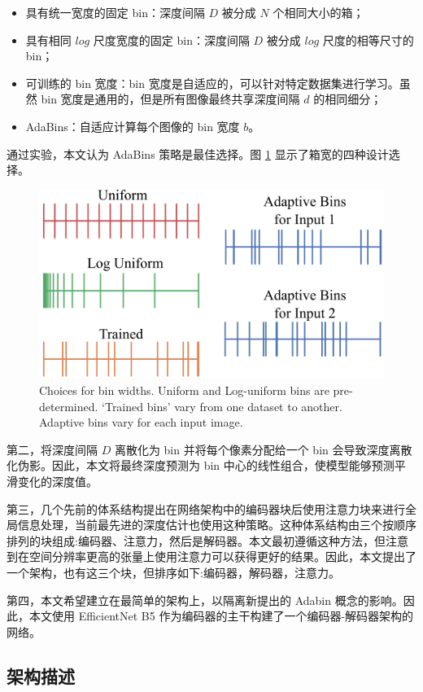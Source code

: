 \documentclass{vip-theme}
\begin{document}
 \begin{itemize}
 	\item 具有统一宽度的固定 bin：深度间隔 $D$ 被分成 $N$ 个相同大小的箱；
	\item 具有相同 $log$ 尺度宽度的固定 bin：深度间隔 $D$ 被分成 $log$ 尺度的相等尺寸的 bin；
	\item 可训练的 bin 宽度：bin 宽度是自适应的，可以针对特定数据集进行学习。虽然 bin 宽度是通用的，但是所有图像最终共享深度间隔 $d$ 的相同细分；
	\item AdaBins：自适应计算每个图像的 bin 宽度 $b$。
 \end{itemize}
 
通过实验，本文认为 AdaBins 策略是最佳选择。图 \ref{fig:binchoices} 显示了箱宽的四种设计选择。

\begin{figure}[!htbp]
\centering
   \includegraphics[width=0.7\linewidth]{./figure/bin-types-v2}
   \caption{Choices for bin widths. Uniform and Log-uniform bins are pre-determined. `Trained bins' vary from one dataset to another. Adaptive bins vary for each input image.}
\label{fig:binchoices}
\end{figure}

     第二，将深度间隔 $D$ 离散化为 bin 并将每个像素分配给一个 bin 会导致深度离散化伪影。因此，本文将最终深度预测为 bin 中心的线性组合，使模型能够预测平滑变化的深度值。
     
     第三，几个先前的体系结构提出在网络架构中的编码器块后使用注意力块来进行全局信息处理，当前最先进的深度估计也使用这种策略。这种体系结构由三个按顺序排列的块组成:编码器、注意力，然后是解码器。本文最初遵循这种方法，但注意到在空间分辨率更高的张量上使用注意力可以获得更好的结果。因此，本文提出了一个架构，也有这三个块，但排序如下:编码器，解码器，注意力。
     
    第四，本文希望建立在最简单的架构上，以隔离新提出的 Adabin 概念的影响。因此，本文使用 EfficientNet B5 作为编码器的主干构建了一个编码器-解码器架构的网络。
    
\subsection{架构描述}
\end{document}
